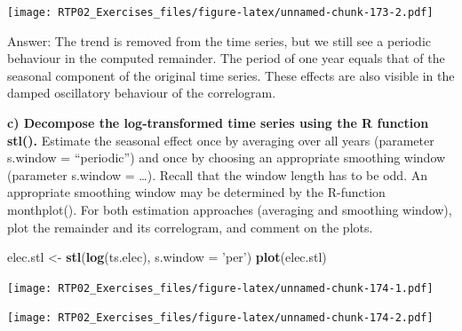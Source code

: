 \documentclass[
]{article}
\newenvironment{Shaded}{\begin{snugshade}}{\end{snugshade}}
\newcommand{\DataTypeTok}[1]{\textcolor[rgb]{0.13,0.29,0.53}{#1}}
\newcommand{\DecValTok}[1]{\textcolor[rgb]{0.00,0.00,0.81}{#1}}
\newcommand{\KeywordTok}[1]{\textcolor[rgb]{0.13,0.29,0.53}{\textbf{#1}}}
\newcommand{\NormalTok}[1]{#1}
\newcommand{\OperatorTok}[1]{\textcolor[rgb]{0.81,0.36,0.00}{\textbf{#1}}}
\newcommand{\StringTok}[1]{\textcolor[rgb]{0.31,0.60,0.02}{#1}}
\begin{document}
\texttt{[image: RTP02\_Exercises\_files/figure-latex/unnamed-chunk-173-2.pdf]}

Answer: The trend is removed from the time series, but we still see a
periodic behaviour in the computed remainder. The period of one year
equals that of the seasonal component of the original time series. These
effects are also visible in the damped oscillatory behaviour of the
correlogram.

\textbf{c) Decompose the log-transformed time series using the R
function stl().} Estimate the seasonal effect once by averaging over all
years (parameter s.window = ``periodic'') and once by choosing an
appropriate smoothing window (parameter s.window = \ldots). Recall that
the window length has to be odd. An appropriate smoothing window may be
determined by the R-function monthplot(). For both estimation approaches
(averaging and smoothing window), plot the remainder and its
correlogram, and comment on the plots.

\begin{Shaded}
\begin{Highlighting}[]
\NormalTok{elec.stl <-}\StringTok{ }\KeywordTok{stl}\NormalTok{(}\KeywordTok{log}\NormalTok{(ts.elec), }\DataTypeTok{s.window =} \StringTok{'per'}\NormalTok{)}
\KeywordTok{plot}\NormalTok{(elec.stl)}
\end{Highlighting}
\end{Shaded}

\texttt{[image: RTP02\_Exercises\_files/figure-latex/unnamed-chunk-174-1.pdf]}

\begin{Shaded}
\end{Shaded}

\texttt{[image: RTP02\_Exercises\_files/figure-latex/unnamed-chunk-174-2.pdf]}

\begin{Shaded}
\end{Shaded}
\end{document}
